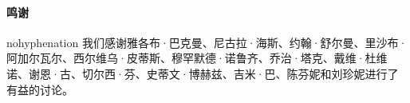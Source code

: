 \paragraph{鸣谢}

\begin{hyphenrules}{nohyphenation}
我们感谢雅各布·巴克曼、尼古拉·海斯、约翰·舒尔曼、里沙布·阿加尔瓦尔、西尔维乌·皮蒂斯、穆罕默德·诺鲁齐、乔治·塔克、戴维·杜维诺、谢恩·古、切尔西·芬、史蒂文·博赫兹、吉米·巴、陈芬妮和刘珍妮进行了有益的讨论。
\end{hyphenrules}
